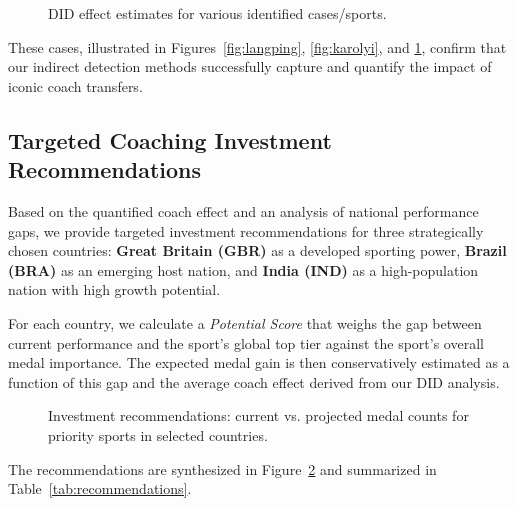 \documentclass{mcmthesis}
\begin{document}
\begin{figure}[htbp]
    \centering
    \caption{DID effect estimates for various identified cases/sports.}
    \label{fig:did_effects}
\end{figure}

These cases, illustrated in Figures~\ref{fig:langping}, \ref{fig:karolyi}, and \ref{fig:did_effects}, confirm that our indirect detection methods successfully capture and quantify the impact of iconic coach transfers.

\subsection{Targeted Coaching Investment Recommendations}

Based on the quantified coach effect and an analysis of national performance gaps, we provide targeted investment recommendations for three strategically chosen countries: \textbf{Great Britain (GBR)} as a developed sporting power, \textbf{Brazil (BRA)} as an emerging host nation, and \textbf{India (IND)} as a high-population nation with high growth potential.

For each country, we calculate a \emph{Potential Score} that weighs the gap between current performance and the sport's global top tier against the sport's overall medal importance. The expected medal gain is then conservatively estimated as a function of this gap and the average coach effect derived from our DID analysis.

\begin{figure}[htbp]
    \centering
    \caption{Investment recommendations: current vs. projected medal counts for priority sports in selected countries.}
    \label{fig:invest}
\end{figure}

The recommendations are synthesized in Figure~\ref{fig:invest} and summarized in Table~\ref{tab:recommendations}.
\end{document}
